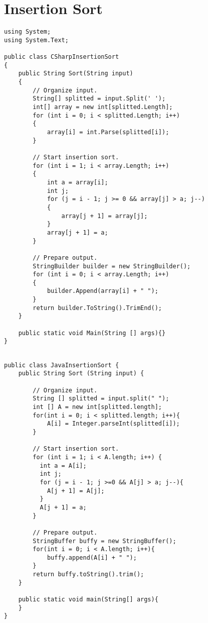 \section{Insertion Sort}

	\lstset{style=sharpc}
	\begin{lstlisting}
using System;
using System.Text;

public class CSharpInsertionSort
{
	public String Sort(String input)
	{
		// Organize input.
		String[] splitted = input.Split(' ');
		int[] array = new int[splitted.Length];
		for (int i = 0; i < splitted.Length; i++)
		{
			array[i] = int.Parse(splitted[i]);
		}

		// Start insertion sort.
		for (int i = 1; i < array.Length; i++)
		{
			int a = array[i];
			int j;
			for (j = i - 1; j >= 0 && array[j] > a; j--)
			{
				array[j + 1] = array[j];
			}
			array[j + 1] = a;
		}

		// Prepare output.
		StringBuilder builder = new StringBuilder();
		for (int i = 0; i < array.Length; i++)
		{
			builder.Append(array[i] + " ");
		}
		return builder.ToString().TrimEnd();
	}
	
	public static void Main(String [] args){}
}

	\end{lstlisting}

	\lstset{style=java}
	\begin{lstlisting}

public class JavaInsertionSort {
	public String Sort (String input) {
		
		// Organize input. 
		String [] splitted = input.split(" ");
		int [] A = new int[splitted.length];
		for(int i = 0; i < splitted.length; i++){
			A[i] = Integer.parseInt(splitted[i]);
		}
		
		// Start insertion sort.
	    for (int i = 1; i < A.length; i++) {
	      int a = A[i];
	      int j;
	      for (j = i - 1; j >=0 && A[j] > a; j--){
	        A[j + 1] = A[j];
	      }
	      A[j + 1] = a;
	    }
	    
	    // Prepare output.
	    StringBuffer buffy = new StringBuffer();
	    for(int i = 0; i < A.length; i++){
	    	buffy.append(A[i] + " ");
	    }
	    return buffy.toString().trim();
	}
	
	public static void main(String[] args){
	}
}

	\end{lstlisting}

